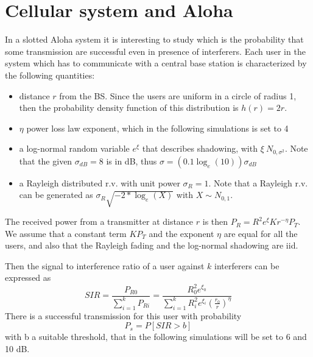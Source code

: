 \documentclass[10pt]{article}
\begin{document}
\section*{Cellular system and Aloha}
In a slotted Aloha system it is interesting to study which is the probability that some transmission are successful even in presence of interferers. 
Each user in the system which has to communicate with a central base station is characterized by the following quantities:
\begin{itemize}
\item distance $r$ from the BS. Since the users are uniform in a circle of radius 1, then the probability density function of this distribution is $h(r) = 2r$.
\item $\eta$ power loss law exponent, which in the following simulations is set to 4
\item a log-normal random variable $e^{\xi}$ that describes shadowing, with $\xi ~ N_{0,\sigma^2}$. Note that the given $\sigma_{dB}= 8$ is in dB, thus $\sigma = (0.1 \log_e(10))\sigma_{dB}$
\item a Rayleigh distributed r.v. with unit power $\sigma_R = 1$. Note that a Rayleigh r.v. can be generated as $\sigma_R \sqrt{-2*\log_e(X)}$ with $X \sim N_{0,1}$.
\end{itemize}
The received power from a transmitter at distance $r$ is then $P_R = R^2 e^{\xi} K r^{-\eta} P_T$. We assume that a constant term $K P_T$ and the exponent $\eta$ are equal for all the users, and also that the Rayleigh fading and the log-normal shadowing are iid. 

Then the signal to interference ratio of a user against $k$ interferers can be expressed as
\begin{equation}
  SIR = \frac{P_{R0}}{\sum_{i=1}^{k} P_{Ri}} = \frac{R_0^2 e^{\xi_0}}{\sum_{i = 1}^{k}R_i^2 e^{\xi_i}\left(\frac{r_0}{r}\right)^{\eta}}
\end{equation}
There is a successful transmission for this user with probability 
\begin{equation}
  P_s = P[SIR > b]
  \label{eq:ps}
\end{equation}
with b a suitable threshold, that in the following simulations will be set to 6 and 10 dB. 
\end{document}
